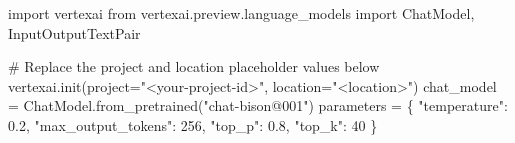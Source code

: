 \documentclass[
  letterpaper,
  DIV=11,
  numbers=noendperiod]{scrreprt}
\newenvironment{Shaded}{\begin{snugshade}}{\end{snugshade}}
\newcommand{\CommentTok}[1]{\textcolor[rgb]{0.37,0.37,0.37}{#1}}
\newcommand{\DecValTok}[1]{\textcolor[rgb]{0.68,0.00,0.00}{#1}}
\newcommand{\FloatTok}[1]{\textcolor[rgb]{0.68,0.00,0.00}{#1}}
\newcommand{\ImportTok}[1]{\textcolor[rgb]{0.00,0.46,0.62}{#1}}
\newcommand{\NormalTok}[1]{\textcolor[rgb]{0.00,0.23,0.31}{#1}}
\newcommand{\OperatorTok}[1]{\textcolor[rgb]{0.37,0.37,0.37}{#1}}
\newcommand{\StringTok}[1]{\textcolor[rgb]{0.13,0.47,0.30}{#1}}
\begin{document}
\begin{Shaded}
\begin{Highlighting}[]
\ImportTok{import}\NormalTok{ vertexai}
\ImportTok{from}\NormalTok{ vertexai.preview.language\_models }\ImportTok{import}\NormalTok{ ChatModel, InputOutputTextPair}

\CommentTok{\# Replace the project and location placeholder values below}
\NormalTok{vertexai.init(project}\OperatorTok{=}\StringTok{"\textless{}your{-}project{-}id\textgreater{}"}\NormalTok{, location}\OperatorTok{=}\StringTok{"\textless{}location\textgreater{}"}\NormalTok{)}
\NormalTok{chat\_model }\OperatorTok{=}\NormalTok{ ChatModel.from\_pretrained(}\StringTok{"chat{-}bison@001"}\NormalTok{)}
\NormalTok{parameters }\OperatorTok{=}\NormalTok{ \{}
    \StringTok{"temperature"}\NormalTok{: }\FloatTok{0.2}\NormalTok{,}
    \StringTok{"max\_output\_tokens"}\NormalTok{: }\DecValTok{256}\NormalTok{,}
    \StringTok{"top\_p"}\NormalTok{: }\FloatTok{0.8}\NormalTok{,}
    \StringTok{"top\_k"}\NormalTok{: }\DecValTok{40}
\NormalTok{\}}
\end{Highlighting}
\end{Shaded}
\end{document}
